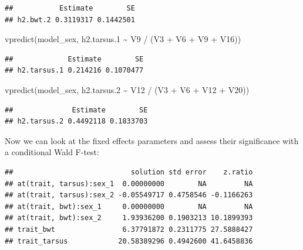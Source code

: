 \documentclass[
  12pt,
]{book}
\newenvironment{Shaded}{\begin{snugshade}}{\end{snugshade}}
\newcommand{\AttributeTok}[1]{\textcolor[rgb]{0.77,0.63,0.00}{#1}}
\newcommand{\ConstantTok}[1]{\textcolor[rgb]{0.00,0.00,0.00}{#1}}
\newcommand{\FloatTok}[1]{\textcolor[rgb]{0.00,0.00,0.81}{#1}}
\newcommand{\FunctionTok}[1]{\textcolor[rgb]{0.00,0.00,0.00}{#1}}
\newcommand{\NormalTok}[1]{#1}
\newcommand{\SpecialCharTok}[1]{\textcolor[rgb]{0.00,0.00,0.00}{#1}}
\newcommand{\StringTok}[1]{\textcolor[rgb]{0.31,0.60,0.02}{#1}}
\begin{document}
\begin{verbatim}
##           Estimate        SE
## h2.bwt.2 0.3119317 0.1442501
\end{verbatim}

\begin{Shaded}
\begin{Highlighting}[]
\FunctionTok{vpredict}\NormalTok{(model\_sex, h2.tarsus}\FloatTok{.1} \SpecialCharTok{\textasciitilde{}}\NormalTok{ V9 }\SpecialCharTok{/}\NormalTok{ (V3 }\SpecialCharTok{+}\NormalTok{ V6 }\SpecialCharTok{+}\NormalTok{ V9 }\SpecialCharTok{+}\NormalTok{ V16))}
\end{Highlighting}
\end{Shaded}

\begin{verbatim}
##             Estimate        SE
## h2.tarsus.1 0.214216 0.1070477
\end{verbatim}

\begin{Shaded}
\begin{Highlighting}[]
\FunctionTok{vpredict}\NormalTok{(model\_sex, h2.tarsus}\FloatTok{.2} \SpecialCharTok{\textasciitilde{}}\NormalTok{ V12 }\SpecialCharTok{/}\NormalTok{ (V3 }\SpecialCharTok{+}\NormalTok{ V6 }\SpecialCharTok{+}\NormalTok{ V12 }\SpecialCharTok{+}\NormalTok{ V20))}
\end{Highlighting}
\end{Shaded}

\begin{verbatim}
##              Estimate        SE
## h2.tarsus.2 0.4492118 0.1833703
\end{verbatim}

Now we can look at the fixed effects parameters and assess their significance with a conditional Wald F-test:

\begin{Shaded}
\end{Shaded}

\begin{verbatim}
##                            solution std error    z.ratio
## at(trait, tarsus):sex_1  0.00000000        NA         NA
## at(trait, tarsus):sex_2 -0.05549717 0.4758546 -0.1166263
## at(trait, bwt):sex_1     0.00000000        NA         NA
## at(trait, bwt):sex_2     1.93936200 0.1903213 10.1899393
## trait_bwt                6.37791872 0.2311775 27.5888427
## trait_tarsus            20.58389296 0.4942600 41.6458836
\end{verbatim}
\end{document}
